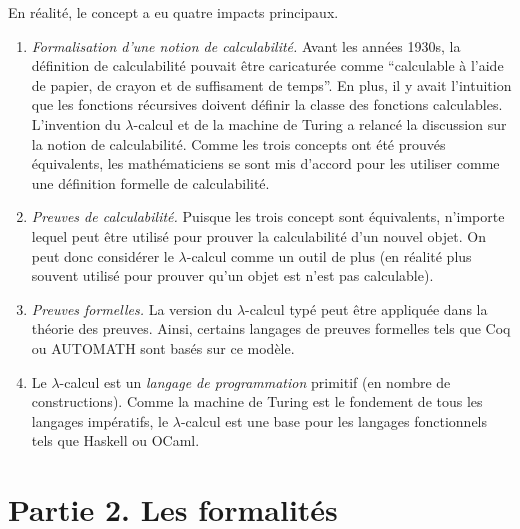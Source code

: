 \documentclass[12pt, a4paper]{article}
\begin{document}
En réalité, le concept a eu quatre impacts principaux.
\begin{enumerate}
	\item \emph{Formalisation d'une notion de calculabilité.} Avant les années 1930s, la définition de calculabilité pouvait être caricaturée comme ``calculable à l'aide de papier, de crayon et de suffisament de temps''. En plus, il y avait l'intuition que les fonctions récursives doivent définir la classe des fonctions calculables.
	L'invention du $\lambda$-calcul et de la machine de Turing a relancé la discussion sur la notion de calculabilité. Comme les trois concepts ont été prouvés équivalents, les mathématiciens se sont mis d'accord pour les utiliser comme une définition formelle de calculabilité.
	\item \emph{Preuves de calculabilité.} Puisque les trois concept sont équivalents, n'importe lequel peut être utilisé pour prouver la calculabilité d'un nouvel objet. On peut donc considérer le $\lambda$-calcul comme un outil de plus (en réalité plus souvent utilisé pour prouver qu'un objet est n'est pas calculable).
	\item \emph{Preuves formelles.}
	La version du $\lambda$-calcul typé peut être appliquée dans la théorie des preuves. Ainsi, certains langages de preuves formelles tels que Coq ou AUTOMATH sont basés sur ce modèle.
	
	\item Le $\lambda$-calcul est un \emph{langage de programmation} primitif (en nombre de constructions). Comme la machine de Turing est le fondement de tous les langages impératifs, le $\lambda$-calcul est une base pour les langages fonctionnels tels que Haskell ou OCaml.
\end{enumerate}

\newpage
\section*{Partie 2. Les formalités}
\end{document}
